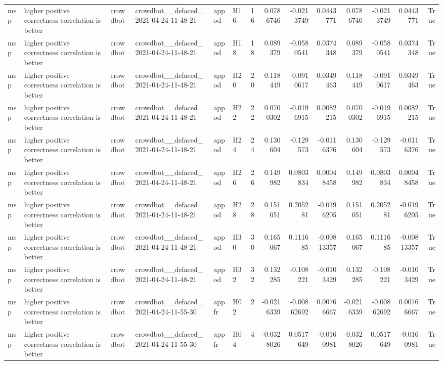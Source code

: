 \begin{longtable}{llllllrrrrrrrr}
msp & higher positive correctness correlation is better & crowdbot & crowdbot\_\_defaced\_2021-04-24-11-48-21 & appod & H16 & 16 & 0.0786746 & -0.0213749 & 0.0443771 & 0.0786746 & -0.0213749 & 0.0443771 & True \\
msp & higher positive correctness correlation is better & crowdbot & crowdbot\_\_defaced\_2021-04-24-11-48-21 & appod & H18 & 18 & 0.089379 & -0.0580541 & 0.0374348 & 0.089379 & -0.0580541 & 0.0374348 & True \\
msp & higher positive correctness correlation is better & crowdbot & crowdbot\_\_defaced\_2021-04-24-11-48-21 & appod & H20 & 20 & 0.118449 & -0.0910617 & 0.0349463 & 0.118449 & -0.0910617 & 0.0349463 & True \\
msp & higher positive correctness correlation is better & crowdbot & crowdbot\_\_defaced\_2021-04-24-11-48-21 & appod & H22 & 22 & 0.0700302 & -0.0196915 & 0.0082215 & 0.0700302 & -0.0196915 & 0.0082215 & True \\
msp & higher positive correctness correlation is better & crowdbot & crowdbot\_\_defaced\_2021-04-24-11-48-21 & appod & H24 & 24 & 0.130604 & -0.129573 & -0.0116376 & 0.130604 & -0.129573 & -0.0116376 & True \\
msp & higher positive correctness correlation is better & crowdbot & crowdbot\_\_defaced\_2021-04-24-11-48-21 & appod & H26 & 26 & 0.149982 & 0.0803834 & 0.00048458 & 0.149982 & 0.0803834 & 0.00048458 & True \\
msp & higher positive correctness correlation is better & crowdbot & crowdbot\_\_defaced\_2021-04-24-11-48-21 & appod & H28 & 28 & 0.151051 & 0.205281 & -0.0196205 & 0.151051 & 0.205281 & -0.0196205 & True \\
msp & higher positive correctness correlation is better & crowdbot & crowdbot\_\_defaced\_2021-04-24-11-48-21 & appod & H30 & 30 & 0.165067 & 0.111685 & -0.00813357 & 0.165067 & 0.111685 & -0.00813357 & True \\
msp & higher positive correctness correlation is better & crowdbot & crowdbot\_\_defaced\_2021-04-24-11-48-21 & appod & H32 & 32 & 0.132285 & -0.108221 & -0.0103429 & 0.132285 & -0.108221 & -0.0103429 & True \\
msp & higher positive correctness correlation is better & crowdbot & crowdbot\_\_defaced\_2021-04-24-11-55-30 & appfr & H02 & 2 & -0.0216339 & -0.00862692 & 0.00766667 & -0.0216339 & -0.00862692 & 0.00766667 & True \\
msp & higher positive correctness correlation is better & crowdbot & crowdbot\_\_defaced\_2021-04-24-11-55-30 & appfr & H04 & 4 & -0.0328026 & 0.0517649 & -0.0160981 & -0.0328026 & 0.0517649 & -0.0160981 & True \\

\end{longtable}
